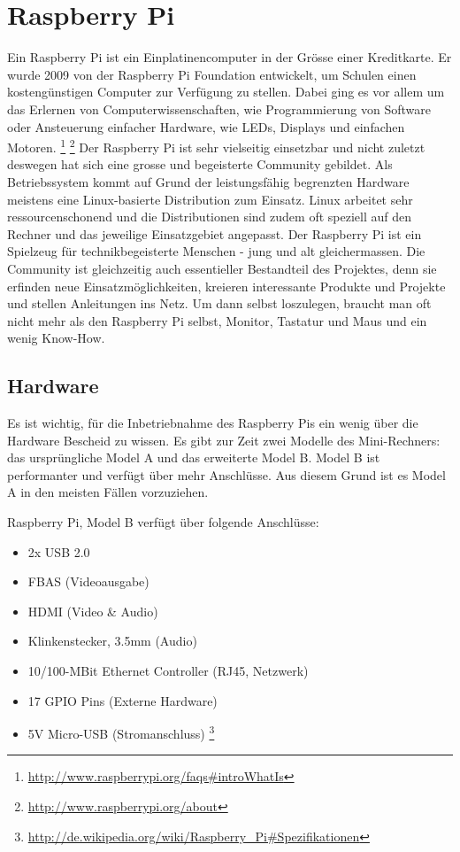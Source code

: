 \section{Raspberry Pi}
Ein Raspberry Pi ist ein Einplatinencomputer in der Grösse einer Kreditkarte.
Er wurde 2009 von der Raspberry Pi Foundation entwickelt, um Schulen einen kostengünstigen Computer zur Verfügung zu stellen.
Dabei ging es vor allem um das Erlernen von Computerwissenschaften, wie Programmierung von Software oder Ansteuerung einfacher Hardware, wie LEDs, Displays und einfachen Motoren.
\footnote{\url{http://www.raspberrypi.org/faqs\#introWhatIs}}
\footnote{\url{http://www.raspberrypi.org/about}}
Der Raspberry Pi ist sehr vielseitig einsetzbar und nicht zuletzt deswegen hat sich eine grosse und begeisterte Community gebildet. Als Betriebssystem kommt auf Grund der leistungsfähig begrenzten Hardware meistens eine Linux-basierte Distribution zum Einsatz. Linux arbeitet sehr ressourcenschonend und die Distributionen sind zudem oft speziell auf den Rechner und das jeweilige Einsatzgebiet angepasst.
Der Raspberry Pi ist ein Spielzeug für technikbegeisterte Menschen - jung und alt gleichermassen. Die Community ist gleichzeitig auch essentieller Bestandteil des Projektes, denn sie erfinden neue Einsatzmöglichkeiten, kreieren interessante Produkte und Projekte und stellen Anleitungen ins Netz. Um dann selbst loszulegen, braucht man oft nicht mehr als den Raspberry Pi selbst, Monitor, Tastatur und Maus und ein wenig Know-How.

\subsection{Hardware}
Es ist wichtig, für die Inbetriebnahme des Raspberry Pis ein wenig über die Hardware Bescheid zu wissen.
Es gibt zur Zeit zwei Modelle des Mini-Rechners: das ursprüngliche Model A und das erweiterte Model B. Model B ist performanter und verfügt über mehr Anschlüsse. Aus diesem Grund ist es Model A in den meisten Fällen vorzuziehen.

Raspberry Pi, Model B verfügt über folgende Anschlüsse:

\begin{itemize}
  \item 2x USB 2.0
  \item FBAS (Videoausgabe)
  \item HDMI (Video \& Audio)
  \item Klinkenstecker, 3.5mm (Audio)
  \item 10/100-MBit Ethernet Controller (RJ45, Netzwerk)
  \item 17 GPIO Pins (Externe Hardware)
  \item 5V Micro-USB (Stromanschluss)
\footnote{\url{http://de.wikipedia.org/wiki/Raspberry_Pi\#Spezifikationen}}
\end{itemize}


